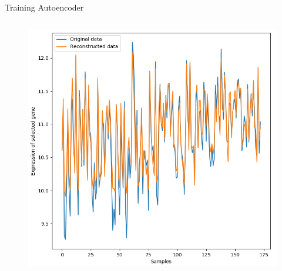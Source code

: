 \documentclass{beamer}
\begin{document}
\begin{frame}{Training Autoencoder}
\begin{columns}
\begin{column}[t]{.48\textwidth}
\begin{figure}[ht]
        \includegraphics[width=1.0\textwidth,height=0.7\textheight]{figures/ae_reconstruction.png}
        \caption*{\label{fig:ae-reconstruction}}
      \end{figure}
    \end{column}
  \end{columns}
\end{frame}
\end{document}
